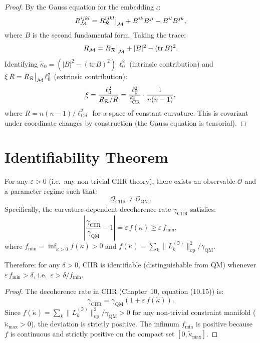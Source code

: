 \begin{proof}
By the Gauss equation for the embedding $\iota$:
\[
  R_{\mathcal{M}}^{ijkl} = R_{\mathcal{R}}^{ijkl}\big|_{\mathcal{M}} + B^{ik}B^{jl} - B^{il}B^{jk},
\]
where $B$ is the second fundamental form.  Taking the trace:
\[
  R_{\mathcal{M}} = R_{\mathcal{R}}\big|_{\mathcal{M}} + |B|^2 - (\mathrm{tr}\,B)^2.
\]
Identifying $\tilde{\kappa}_0 = (|B|^2 - (\mathrm{tr}\,B)^2)\,\ell_0^2$
(intrinsic contribution) and $\xi\,R = R_{\mathcal{R}}\big|_{\mathcal{M}}\,\ell_0^2$
(extrinsic contribution):
\[
  \xi = \frac{\ell_0^2}{R_{\mathcal{R}} / R}
  = \frac{\ell_0^2}{\ell_{\mathrm{CR}}^2} \cdot \frac{1}{n(n-1)},
\]
where $R = n(n-1)/\ell_{\mathrm{CR}}^2$ for a space of constant
curvature.  This is covariant under coordinate changes by construction
(the Gauss equation is tensorial).
\end{proof}

\section{Identifiability Theorem}
\label{sec:identifiability}

\begin{theorem}\label{thm:12.12}
For any $\varepsilon > 0$ (i.e.\ any non-trivial CIIR theory), there
exists an observable $\mathcal{O}$ and a parameter regime such that:
\[
  \mathcal{O}_{\mathrm{CIIR}} \neq \mathcal{O}_{\mathrm{QM}}.
\]
Specifically, the curvature-dependent decoherence rate
$\gamma_{\mathrm{CIIR}}$ satisfies:
\begin{equation}\label{eq:identifiability}
  \left|\frac{\gamma_{\mathrm{CIIR}}}{\gamma_{\mathrm{QM}}} - 1\right|
  = \varepsilon\,f(\tilde{\kappa})
  \geq \varepsilon\,f_{\min},
\end{equation}
where $f_{\min} = \inf_{\tilde{\kappa} > 0} f(\tilde{\kappa}) > 0$ and
$f(\tilde{\kappa}) = \sum_k \|L_k^{(\mathfrak{I})}\|_{\mathrm{op}}^2 / \gamma_{\mathrm{QM}}$.

Therefore: for any $\delta > 0$, CIIR is identifiable (distinguishable
from QM) whenever $\varepsilon\,f_{\min} > \delta$, i.e.\
$\varepsilon > \delta / f_{\min}$.
\end{theorem}

\begin{proof}
The decoherence rate in CIIR (Chapter~10, equation (10.15)) is:
\[
  \gamma_{\mathrm{CIIR}} = \gamma_{\mathrm{QM}}(1 + \varepsilon\,f(\tilde{\kappa})).
\]
Since $f(\tilde{\kappa}) = \sum_k \|L_k^{(\mathfrak{I})}\|_{\mathrm{op}}^2 / \gamma_{\mathrm{QM}} > 0$
for any non-trivial constraint manifold ($\tilde{\kappa}_{\max} > 0$),
the deviation is strictly positive.  The infimum $f_{\min}$ is positive
because $f$ is continuous and strictly positive on the compact set
$[0, \tilde{\kappa}_{\max}]$.
\end{proof}

